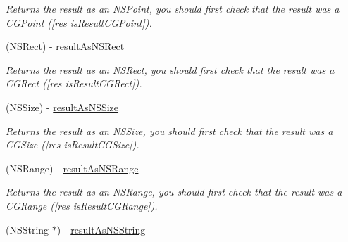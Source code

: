 \begin{DoxyCompactItemize}
\begin{DoxyCompactList}\small\item\em Returns the result as an NSPoint, you should first check that the result was a CGPoint (\mbox{[}res isResultCGPoint\mbox{]}). \item\end{DoxyCompactList}\item 
\hypertarget{interface_g_d_accessibility_operation_result_abf61581a94f9092d2101b29343ce63ff}{
(NSRect) -\/ \hyperlink{interface_g_d_accessibility_operation_result_abf61581a94f9092d2101b29343ce63ff}{resultAsNSRect}}
\label{interface_g_d_accessibility_operation_result_abf61581a94f9092d2101b29343ce63ff}

\begin{DoxyCompactList}\small\item\em Returns the result as an NSRect, you should first check that the result was a CGRect (\mbox{[}res isResultCGRect\mbox{]}). \item\end{DoxyCompactList}\item 
\hypertarget{interface_g_d_accessibility_operation_result_a9c532472181f102c06aa94e2886770a9}{
(NSSize) -\/ \hyperlink{interface_g_d_accessibility_operation_result_a9c532472181f102c06aa94e2886770a9}{resultAsNSSize}}
\label{interface_g_d_accessibility_operation_result_a9c532472181f102c06aa94e2886770a9}

\begin{DoxyCompactList}\small\item\em Returns the result as an NSSize, you should first check that the result was a CGSize (\mbox{[}res isResultCGSize\mbox{]}). \item\end{DoxyCompactList}\item 
\hypertarget{interface_g_d_accessibility_operation_result_ab9038dca21cd45c724c96116faf1e37e}{
(NSRange) -\/ \hyperlink{interface_g_d_accessibility_operation_result_ab9038dca21cd45c724c96116faf1e37e}{resultAsNSRange}}
\label{interface_g_d_accessibility_operation_result_ab9038dca21cd45c724c96116faf1e37e}

\begin{DoxyCompactList}\small\item\em Returns the result as an NSRange, you should first check that the result was a CGRange (\mbox{[}res isResultCGRange\mbox{]}). \item\end{DoxyCompactList}\item 
\hypertarget{interface_g_d_accessibility_operation_result_a8f872f6f46a21d122fec5efdb756a2a2}{
(NSString $\ast$) -\/ \hyperlink{interface_g_d_accessibility_operation_result_a8f872f6f46a21d122fec5efdb756a2a2}{resultAsNSString}}
\label{interface_g_d_accessibility_operation_result_a8f872f6f46a21d122fec5efdb756a2a2}


\end{DoxyCompactItemize}
